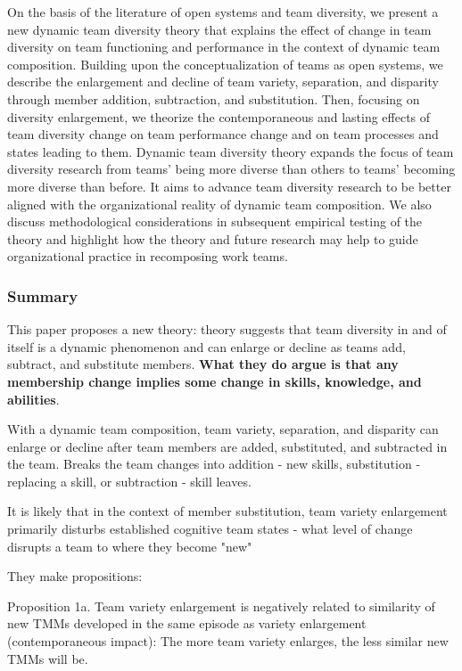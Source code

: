 \documentclass[12pt]{article}
\begin{document}
On the basis of the literature of open systems and team diversity, we present a new dynamic team diversity theory that explains the effect of change in team diversity on team functioning and performance in the context of dynamic team composition. Building upon the conceptualization of teams as open systems, we describe the enlargement and decline of team variety, separation, and disparity through member addition, subtraction, and substitution. Then, focusing on diversity enlargement, we theorize the contemporaneous and lasting effects of team diversity change on team performance change and on team processes and states leading to them. Dynamic team diversity theory expands the focus of team diversity research from teams' being more diverse than others to teams' becoming more diverse than before. It aims to advance team diversity research to be better aligned with the organizational reality of dynamic team composition. We also discuss methodological considerations in subsequent empirical testing of the theory and highlight how the theory and future research may help to guide organizational practice in recomposing work teams.

\subsubsection*{Summary}

This paper proposes a new theory: theory suggests that team diversity in and of itself is a dynamic phenomenon and can enlarge or decline as teams add, subtract, and substitute members. \textbf{What they do argue is that any membership change implies some change in skills, knowledge, and abilities}.

With a dynamic team composition, team variety, separation, and disparity can enlarge or decline after team members are added, substituted, and subtracted in the team. Breaks the team changes into addition - new skills, substitution - replacing a skill, or subtraction - skill leaves.

It is likely that in the context of member substitution, team variety enlargement primarily disturbs established cognitive team states - what level of change disrupts a team to where they become "new"

They make propositions:

Proposition 1a. Team variety enlargement is negatively related to similarity of new TMMs developed in the same episode as variety enlargement (contemporaneous impact): The more team variety enlarges, the less similar new TMMs will be.
\end{document}
